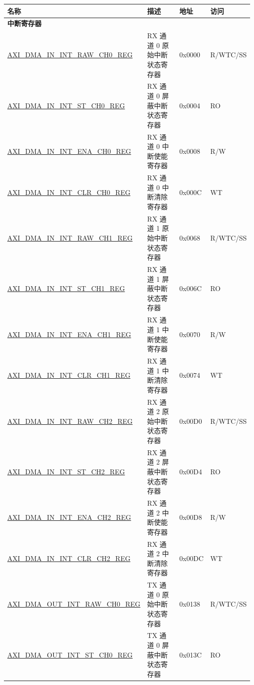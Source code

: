 \begin{longtable}{ | l | l | p{1.3cm} | l | }
\hline\rowcolor{lightgray}
\textbf{名称} & \textbf{描述} &  \textbf{地址} & \textbf{访问} \\ \hline
\endhead
\multicolumn{4}{|l|}{\textbf{中断寄存器}} \\ \hline
\hyperref[regdesc:AXIDMAININTRAWCHNREG]{AXI\_DMA\_IN\_INT\_RAW\_CH0\_REG} & RX 通道 0 原始中断状态寄存器 & 0x0000 & R/WTC/SS \\ \hline
\hyperref[regdesc:AXIDMAININTSTCHNREG]{AXI\_DMA\_IN\_INT\_ST\_CH0\_REG} & RX 通道 0 屏蔽中断状态寄存器 & 0x0004 & RO \\ \hline
\hyperref[regdesc:AXIDMAININTENACHNREG]{AXI\_DMA\_IN\_INT\_ENA\_CH0\_REG} & RX 通道 0 中断使能寄存器 & 0x0008 & R/W \\ \hline
\hyperref[regdesc:AXIDMAININTCLRCHNREG]{AXI\_DMA\_IN\_INT\_CLR\_CH0\_REG} & RX 通道 0 中断清除寄存器 & 0x000C & WT \\ \hline
\hyperref[regdesc:AXIDMAININTRAWCHNREG]{AXI\_DMA\_IN\_INT\_RAW\_CH1\_REG} & RX 通道 1 原始中断状态寄存器 & 0x0068 & R/WTC/SS \\ \hline
\hyperref[regdesc:AXIDMAININTSTCHNREG]{AXI\_DMA\_IN\_INT\_ST\_CH1\_REG} & RX 通道 1 屏蔽中断状态寄存器 & 0x006C & RO \\ \hline
\hyperref[regdesc:AXIDMAININTENACHNREG]{AXI\_DMA\_IN\_INT\_ENA\_CH1\_REG} & RX 通道 1 中断使能寄存器 & 0x0070 & R/W \\ \hline
\hyperref[regdesc:AXIDMAININTCLRCHNREG]{AXI\_DMA\_IN\_INT\_CLR\_CH1\_REG} & RX 通道 1 中断清除寄存器 & 0x0074 & WT \\ \hline
\hyperref[regdesc:AXIDMAININTRAWCHNREG]{AXI\_DMA\_IN\_INT\_RAW\_CH2\_REG} & RX 通道 2 原始中断状态寄存器 & 0x00D0 & R/WTC/SS \\ \hline
\hyperref[regdesc:AXIDMAININTSTCHNREG]{AXI\_DMA\_IN\_INT\_ST\_CH2\_REG} & RX 通道 2 屏蔽中断状态寄存器 & 0x00D4 & RO \\ \hline
\hyperref[regdesc:AXIDMAININTENACHNREG]{AXI\_DMA\_IN\_INT\_ENA\_CH2\_REG} & RX 通道 2 中断使能寄存器 & 0x00D8 & R/W \\ \hline
\hyperref[regdesc:AXIDMAININTCLRCHNREG]{AXI\_DMA\_IN\_INT\_CLR\_CH2\_REG} & RX 通道 2 中断清除寄存器 & 0x00DC & WT \\ \hline
\hyperref[regdesc:AXIDMAOUTINTRAWCHNREG]{AXI\_DMA\_OUT\_INT\_RAW\_CH0\_REG} & TX 通道 0 原始中断状态寄存器 & 0x0138 & R/WTC/SS \\ \hline
\hyperref[regdesc:AXIDMAOUTINTSTCHNREG]{AXI\_DMA\_OUT\_INT\_ST\_CH0\_REG} & TX 通道 0 屏蔽中断状态寄存器 & 0x013C & RO \\ \hline

\end{longtable}

